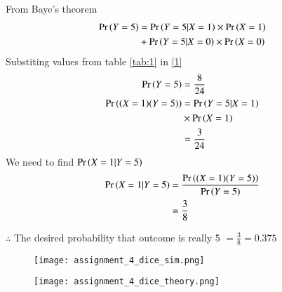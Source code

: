 \documentclass[journal,12pt,twocolumn]{IEEEtran}
\begin{document}
From Baye's theorem
\begin{align}
\Pr\left(Y=5\right)&=\Pr\left(Y=5|X=1\right) \times \Pr\left(X=1\right) \notag \\
 & +\Pr\left(Y=5|X=0\right) \times \Pr\left(X=0\right)  \label{1}
 \end{align}
Substiting values from table \eqref{tab:1} in \eqref{1}
\begin{align}
\Pr\left(Y=5\right) &=\frac{8}{24} \label{2} \\
\Pr\left((X=1)(Y=5)\right)&= \Pr\left(Y=5|X=1\right) \notag \\
& \times \Pr\left(X=1\right) \\ 
&= \frac{3}{24}  \label{3}
\end{align}
We need to find $\Pr\left(X=1|Y=5\right)$ \\
\begin{align}
\Pr\left(X=1|Y=5\right) &= \frac{\Pr\left((X=1 ) (Y=5)\right)}{\Pr\left(Y=5\right)} \\
&=\frac{3}{8}
\end{align}

 $\therefore$ The desired probability that outcome is really 5 $= \frac{3}{8}=0.375$ \\
\begin{figure}[htb!]
\begin{center}
\texttt{[image: assignment\_4\_dice\_sim.png]}
\end{center}
\end{figure}

\begin{figure}[htb!]
\begin{center}
\texttt{[image: assignment\_4\_dice\_theory.png]}
\end{center}
\end{figure}
\end{document}
